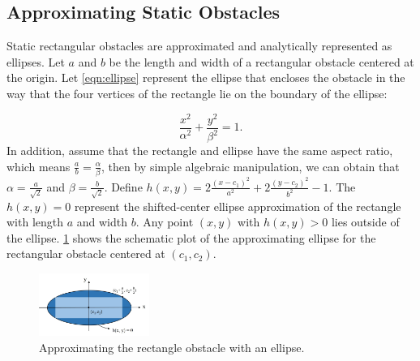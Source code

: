\documentclass[journal]{IEEEtran}
\begin{document}
	\subsection{Approximating Static Obstacles}\label{subsec:ellip_approx}
    
	Static rectangular obstacles are approximated and analytically represented as ellipses. %
	Let $a$ and $b$ be the length and width of a rectangular obstacle centered at the origin.
	Let \cref{eqn:ellipse} represent the ellipse that encloses the obstacle in the way that the four vertices of the rectangle lie on the boundary of the ellipse:
\addtocounter{equation}{-1}
	
	\begin{equation}\label{eqn:ellipse}
		\frac{x^2}{\alpha^2}+\frac{y^2}{\beta^2}=1.
	\end{equation}
	In addition, assume that the rectangle and ellipse have the same aspect ratio, which means $\frac{a}{b}=\frac{\alpha}{\beta}$, then by simple algebraic manipulation, we can obtain that $\alpha=\frac{a}{\sqrt{2}}$ and $\beta=\frac{b}{\sqrt{2}}$.
	Define $h(x,y)=2\frac{(x-c_1)^2}{a^2}+2\frac{(y-c_2)^2}{b^2}-1.$
	The $h(x,y)=0$ represent the shifted-center ellipse approximation of the rectangle with length $a$ and width $b$.
	Any point $(x,y)$ with $h(x,y)>0$ lies outside of the ellipse. \cref{fig:approx_ellipse} shows the schematic plot of the approximating ellipse for the rectangular obstacle centered at $(c_1,c_2)$.
 	\begin{figure}[h]
 		\centering		
 		\includegraphics[width=0.32\textwidth]{figures/ellipse}
 		\caption{Approximating the rectangle obstacle with an ellipse.}
 		\label{fig:approx_ellipse}
 	\end{figure}		
	
\end{document}
